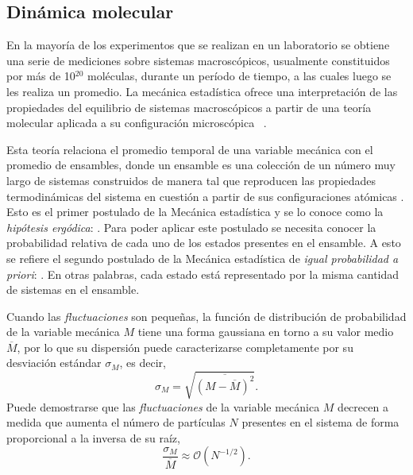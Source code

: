 \subsection{Dinámica molecular}

En la mayoría de los experimentos que se realizan en un laboratorio se obtiene 
una serie de mediciones sobre sistemas macroscópicos, usualmente constituidos por 
más de 10$^{20}$ moléculas, durante un período de tiempo, a las cuales luego se 
les realiza un promedio. La mecánica estadística ofrece una interpretación de 
las propiedades del equilibrio de sistemas macroscópicos a partir de una teoría 
molecular aplicada a su configuración microscópica ~\cite{hill1986}.

Esta teoría relaciona el promedio temporal de una variable mecánica con el 
promedio de ensambles, donde un ensamble es una colección de un número muy largo
de sistemas construidos de manera tal que reproducen las propiedades 
termodinámicas del sistema en cuestión a partir de sus configuraciones atómicas
\cite{salinas2001}. Esto es el primer postulado de la Mecánica estadística y se 
lo conoce como la \textit{hipótesis ergódica}: . Para poder aplicar
este postulado se necesita conocer la probabilidad relativa de cada uno de los 
estados presentes en el ensamble. A esto se refiere el segundo postulado de la 
Mecánica estadística de \textit{igual probabilidad a priori}: . En otras palabras, cada 
estado está representado por la misma cantidad de sistemas en el ensamble.

Cuando las \textit{fluctuaciones} son pequeñas, la función de distribución de 
probabilidad de la variable mecánica $M$ tiene una forma gaussiana en torno a su 
valor medio $\overline{M}$, por lo que su dispersión puede caracterizarse 
completamente por su desviación estándar $\sigma_M$, es decir,
\begin{equation}
    \sigma_M = \sqrt{\overline{(M - \overline{M})^2}}.
\end{equation}
Puede demostrarse que las \textit{fluctuaciones} de la variable mecánica $M$ 
decrecen a medida que aumenta el número de partículas $N$ presentes en el sistema 
de forma proporcional a la inversa de su raíz,
\begin{equation}\label{eq:fluctuaciones}
    \frac{\sigma_M}{\overline{M}} \approx \mathcal{O}(N^{-1/2}).
\end{equation}

